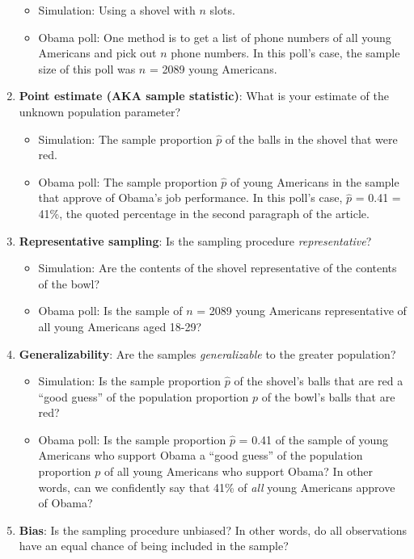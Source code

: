 \documentclass[12pt, krantz2,]{krantz}
\providecommand{\tightlist}{%
  \setlength{\itemsep}{0pt}\setlength{\parskip}{0pt}}
\begin{document}
\begin{enumerate}
  \begin{itemize}
  \tightlist
  \item
    Simulation: Using a shovel with \(n\) slots.
  \item
    Obama poll: One method is to get a list of phone numbers of all young Americans and pick out \(n\) phone numbers. In this poll's case, the sample size of this poll was \(n\) = 2089 young Americans.
  \end{itemize}
\item
  \textbf{Point estimate (AKA sample statistic)}: What is your estimate of the unknown population parameter?

  \begin{itemize}
  \tightlist
  \item
    Simulation: The sample proportion \(\widehat{p}\) of the balls in the shovel that were red.
  \item
    Obama poll: The sample proportion \(\widehat{p}\) of young Americans in the sample that approve of Obama's job performance. In this poll's case, \(\widehat{p}\) = 0.41 = 41\%, the quoted percentage in the second paragraph of the article.
  \end{itemize}
\item
  \textbf{Representative sampling}: Is the sampling procedure \emph{representative}?

  \begin{itemize}
  \tightlist
  \item
    Simulation: Are the contents of the shovel representative of the contents of the bowl?
  \item
    Obama poll: Is the sample of \(n\) = 2089 young Americans representative of all young Americans aged 18-29?
  \end{itemize}
\item
  \textbf{Generalizability}: Are the samples \emph{generalizable} to the greater population?

  \begin{itemize}
  \tightlist
  \item
    Simulation: Is the sample proportion \(\widehat{p}\) of the shovel's balls that are red a ``good guess'' of the population proportion \(p\) of the bowl's balls that are red?
  \item
    Obama poll: Is the sample proportion \(\widehat{p}\) = 0.41 of the sample of young Americans who support Obama a ``good guess'' of the population proportion \(p\) of all young Americans who support Obama? In other words, can we confidently say that 41\% of \emph{all} young Americans approve of Obama?
  \end{itemize}
\item
  \textbf{Bias}: Is the sampling procedure unbiased? In other words, do all observations have an equal chance of being included in the sample?


\end{enumerate}
\end{document}
